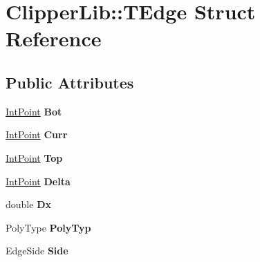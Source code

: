 \hypertarget{struct_clipper_lib_1_1_t_edge}{}\section{Clipper\+Lib\+:\+:T\+Edge Struct Reference}
\label{struct_clipper_lib_1_1_t_edge}
\subsection*{Public Attributes}
\begin{DoxyCompactItemize}
\item 
\mbox{\label{struct_clipper_lib_1_1_t_edge_adddb6b117ed14437613d26cc456bb4bc}} 
\mbox{\hyperlink{struct_clipper_lib_1_1_int_point}{Int\+Point}} {\bfseries Bot}
\item 
\mbox{\label{struct_clipper_lib_1_1_t_edge_ad5932926d3d5d6ed6ae4bc991ed7bcec}} 
\mbox{\hyperlink{struct_clipper_lib_1_1_int_point}{Int\+Point}} {\bfseries Curr}
\item 
\mbox{\label{struct_clipper_lib_1_1_t_edge_a9f09500b780f7492d8c4c511aabf1c96}} 
\mbox{\hyperlink{struct_clipper_lib_1_1_int_point}{Int\+Point}} {\bfseries Top}
\item 
\mbox{\label{struct_clipper_lib_1_1_t_edge_afeb7324b818fe9f667199bd18701e23c}} 
\mbox{\hyperlink{struct_clipper_lib_1_1_int_point}{Int\+Point}} {\bfseries Delta}
\item 
\mbox{\label{struct_clipper_lib_1_1_t_edge_ace215b877c384f917d18f6c1da913959}} 
double {\bfseries Dx}
\item 
\mbox{\label{struct_clipper_lib_1_1_t_edge_aedc0a4d8b17ae3e42555621b22af8296}} 
Poly\+Type {\bfseries Poly\+Typ}
\item 
\mbox{\label{struct_clipper_lib_1_1_t_edge_aa7840242535b7830744f4387aa53bdfa}} 
Edge\+Side {\bfseries Side}
\item 
\mbox{\label{struct_clipper_lib_1_1_t_edge_afd72e2c7b9f97706ead72907509f8bc1}} 

\end{DoxyCompactItemize}
